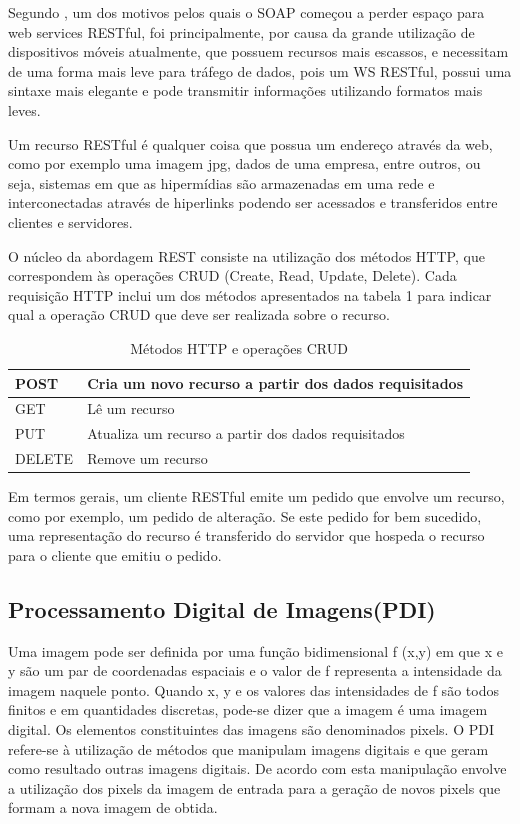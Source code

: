 \documentclass[12pt]{article}
\begin{document}
Segundo \cite{lecheta:15}, um dos motivos pelos quais o SOAP começou a perder espaço para web services RESTful, foi principalmente, por causa da grande utilização de dispositivos móveis atualmente, que possuem recursos mais escassos, e necessitam de uma forma mais leve para tráfego de dados, pois um WS RESTful, possui uma sintaxe mais elegante e pode transmitir informações utilizando formatos mais leves.

Um recurso RESTful é qualquer coisa que possua um endereço através da web, como por exemplo uma imagem jpg, dados de uma empresa, entre outros, ou seja, sistemas em que as hipermídias são armazenadas em uma rede e interconectadas através de hiperlinks podendo ser acessados e transferidos entre clientes e servidores.

O núcleo da abordagem REST consiste na utilização dos métodos HTTP, que correspondem às operações CRUD (Create, Read, Update, Delete). Cada requisição HTTP inclui um dos métodos apresentados na tabela 1 para indicar qual a operação CRUD que deve ser realizada sobre o recurso.
\begin{table}[ht]
	\centering
	\caption{Métodos HTTP e operações CRUD}
	\label{tab:Table1}
	\smallskip
	\begin{tabular}{ |l|l| }
		\hline
		POST & Cria um novo recurso a partir dos dados requisitados \\ \hline
		GET & Lê um recurso \\ \hline
		PUT & Atualiza um recurso a partir dos dados requisitados \\ \hline
		DELETE & Remove um recurso \\
		\hline
	\end{tabular}
\end{table}

Em termos gerais, um cliente RESTful emite um pedido que envolve um recurso, como
por exemplo, um pedido de alteração. Se este pedido for bem sucedido, uma representação
do recurso é transferido do servidor que hospeda o recurso para o cliente que emitiu o
pedido.


\subsection{Processamento Digital de Imagens(PDI)}

Uma imagem pode ser definida por uma função bidimensional f (x,y) em que x e y são um par de coordenadas espaciais e o valor de f representa a intensidade da
imagem naquele ponto. Quando x, y e os valores das intensidades de f são todos finitos e em quantidades discretas, pode-se dizer que a imagem é uma imagem
digital. Os elementos constituintes das imagens são denominados pixels. O PDI refere-se à utilização de métodos que manipulam imagens digitais e que geram
como resultado outras imagens digitais. De acordo com \cite{gonzalez:08} esta manipulação envolve a utilização dos pixels da imagem de entrada para a geração de novos pixels que formam a
nova imagem de obtida.
\end{document}
